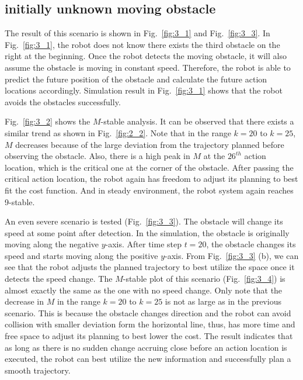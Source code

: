 \subsection{initially unknown moving obstacle}

The result of this scenario is shown in Fig.~\ref{fig:3_1} and Fig.~\ref{fig:3_3}. In Fig.~\ref{fig:3_1}, the robot does not know there exists the third obstacle on the right at the beginning. Once the robot detects the moving obstacle, it will also assume the obstacle is moving in constant speed. Therefore, the robot is able to predict the future position of the obstacle and calculate the future action locations accordingly. Simulation result in Fig.~\ref{fig:3_1} shows that the robot avoids the obstacles successfully.

Fig.~\ref{fig:3_2} shows the $M$-stable analysis. It can be observed that there exists a similar trend as shown in Fig.~\ref{fig:2_2}. Note that in the range $k=20$ to $k=25$, $M$ decreases because of the large deviation from the trajectory planned before observing the obstacle. Also, there is a high peak in $M$ at the $26^{th}$ action location, which is the critical one at the corner of the obstacle. After passing the critical action location, the robot again has freedom to adjust its planning to best fit the cost function. And in steady environment, the robot system again reaches 9-stable. 

An even severe scenario is tested (Fig.~\ref{fig:3_3}). The obstacle will change its speed at some point after detection. In the simulation, the obstacle is originally moving along the negative $y$-axis. After time step $t=20$, the obstacle changes its speed and starts moving along the positive $y$-axis. From Fig.~\ref{fig:3_3} (b), we can see that the robot adjusts the planned trajectory to best utilize the space once it detects the speed change. The $M$-stable plot of this scenario (Fig.~\ref{fig:3_4}) is almost exactly the same as the one with no speed change. Only note that the decrease in $M$ in the range $k=20$ to $k=25$ is not as large as in the previous scenario. This is because the obstacle changes direction and the robot can avoid collision with smaller deviation form the horizontal line, thus, has more time and free space to adjust its planning to best lower the cost. The result indicates that as long as there is no sudden change accruing close before an action location is executed, the robot can best utilize the new information and successfully plan a smooth trajectory.

